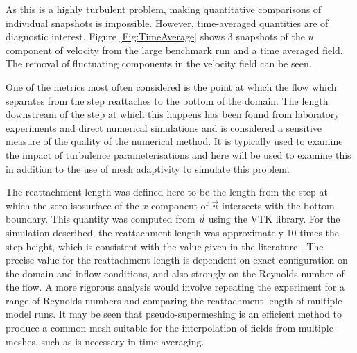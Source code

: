 As this is a highly turbulent problem, making quantitative comparisons of
individual snapshots is impossible. However, time-averaged quantities are of diagnostic interest.
Figure \ref{Fig:TimeAverage} shows 3 snapshots of the $u$ component of velocity from the large
benchmark run and a time
averaged field. The removal of fluctuating components in the velocity field can be seen.




One of the metrics most often considered is the point at which the flow which separates from the step
reattaches to the bottom of the domain. The length downstream of the step at which this happens
has been found from laboratory experiments and direct numerical simulations and is considered a
sensitive measure of the quality of the numerical method. It is typically used to examine the impact
of turbulence parameterisations and here will be used to examine this in addition to the use of mesh
adaptivity to simulate this problem.

The reattachment length was defined here to be the length
from the step at which the zero-isosurface of the $x$-component of $\vec{u}$ intersects with
the bottom boundary. This quantity was computed from $\vec{u}$
using the VTK library. For the simulation described, the reattachment
length was approximately 10 times the step height, which is consistent with the value
given in the literature \cite{le1997}.
The precise value for the reattachment length is dependent on exact configuration on the domain and inflow
conditions, and also strongly on the Reynolds number of the flow.
A more rigorous analysis would involve
repeating the experiment for a range of Reynolds numbers and comparing the reattachment
length of multiple model runs. It may be seen that pseudo-supermeshing is an efficient
method to produce a common mesh suitable for the interpolation of fields from multiple
meshes, such as is necessary in time-averaging.

